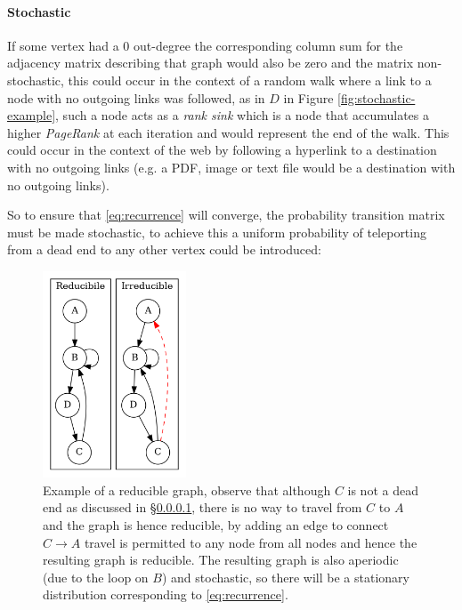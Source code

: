 \documentclass[11pt]{report}
\begin{document}
\paragraph{Stochastic}
\label{stochastic}
If some vertex had a 0 out-degree the corresponding column sum for the adjacency
matrix describing that graph would also be zero and the matrix non-stochastic,
this could occur in the context of a random walk where a link to a node with no
outgoing links was followed, as in \(D\) in Figure \ref{fig:stochastic-example},
such a node acts as a \textit{rank
  sink} \cite[\S 4.3]{langvilleGooglePageRankScience2012} which is a node that
accumulates a higher \textit{PageRank} at each iteration and would represent the
end of the walk. This could occur in the context of the web by following a
hyperlink to a destination with no outgoing links (e.g. a PDF, image or text
file would be a destination with no outgoing links).

So to ensure that \eqref{eq:recurrence} will converge, the probability
transition matrix must be made stochastic, to achieve this a uniform probability
of teleporting from a dead end to any other vertex could be introduced:


 \begin{figure}
     \includegraphics[width=0.38\textwidth]{media/dot/reducible_graph_example.dot.png}
     \caption{\label{irreducible-example}Example of a reducible graph, observe that although \(C\) is not a dead end as discussed in \S \ref{stochastic}, there is no way to travel from \(C\) to \(A\) and the graph is hence reducible, by adding an edge to connect \(C\rightarrow A\) travel is permitted to any node from all nodes and hence the resulting graph is reducible. The resulting graph is also aperiodic (due to the loop on \(B\)) and stochastic, so there will be a stationary distribution corresponding to \eqref{eq:recurrence}.}
 \end{figure}
\end{document}
